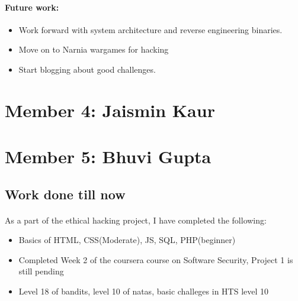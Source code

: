 \documentclass{article}
\begin{document}
\begin{itemize}
\paragraph{Future work:}
\begin{itemize}
	\item Work forward with system architecture and reverse engineering binaries.
	\item Move on to Narnia wargames for hacking
	\item Start blogging about good challenges.
\end{itemize}


\newpage
\section*{Member 4: Jaismin Kaur}

\newpage
\section*{Member 5: Bhuvi Gupta}
\subsection*{Work done till now}
\paragraph{}
As a part of the ethical hacking project, I have completed the following:
\begin{itemize}
    \item Basics of HTML, CSS(Moderate), JS, SQL, PHP(beginner)
    \item Completed Week 2 of the coursera course on Software Security, Project 1 is still pending
    \item Level 18 of bandits, level 10 of natas, basic challeges in HTS level 10
\end{itemize}


\end{itemize}
\end{document}
